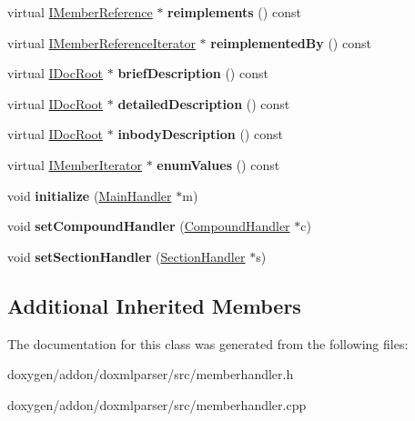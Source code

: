 \begin{DoxyCompactItemize}
virtual \mbox{\hyperlink{class_i_member_reference}{I\+Member\+Reference}} $\ast$ {\bfseries reimplements} () const
\item 
\mbox{\label{class_member_handler_a49ac7fe68be6ef7a936898ff6331d6e6}} 
virtual \mbox{\hyperlink{class_i_member_reference_iterator}{I\+Member\+Reference\+Iterator}} $\ast$ {\bfseries reimplemented\+By} () const
\item 
\mbox{\label{class_member_handler_a20e9b6df52d39abdda9cc197d75e97e8}} 
virtual \mbox{\hyperlink{class_i_doc_root}{I\+Doc\+Root}} $\ast$ {\bfseries brief\+Description} () const
\item 
\mbox{\label{class_member_handler_a165a340c25e1df9e4e68bf8d65c274e3}} 
virtual \mbox{\hyperlink{class_i_doc_root}{I\+Doc\+Root}} $\ast$ {\bfseries detailed\+Description} () const
\item 
\mbox{\label{class_member_handler_a71748bca8b5db16cc68fa991cdb06070}} 
virtual \mbox{\hyperlink{class_i_doc_root}{I\+Doc\+Root}} $\ast$ {\bfseries inbody\+Description} () const
\item 
\mbox{\label{class_member_handler_a2b209d093ff2d7519aafe213887dc7d5}} 
virtual \mbox{\hyperlink{class_i_member_iterator}{I\+Member\+Iterator}} $\ast$ {\bfseries enum\+Values} () const
\item 
\mbox{\label{class_member_handler_aa5cb3b1084f6b5dcf95cce1a3a8c3001}} 
void {\bfseries initialize} (\mbox{\hyperlink{class_main_handler}{Main\+Handler}} $\ast$m)
\item 
\mbox{\label{class_member_handler_a6c51c7b8f2e908935b38c5884f1d297c}} 
void {\bfseries set\+Compound\+Handler} (\mbox{\hyperlink{class_compound_handler}{Compound\+Handler}} $\ast$c)
\item 
\mbox{\label{class_member_handler_ac39c2846f64c32a7311bd15d73587025}} 
void {\bfseries set\+Section\+Handler} (\mbox{\hyperlink{class_section_handler}{Section\+Handler}} $\ast$s)
\end{DoxyCompactItemize}
\subsection*{Additional Inherited Members}


The documentation for this class was generated from the following files\+:\begin{DoxyCompactItemize}
\item 
doxygen/addon/doxmlparser/src/memberhandler.\+h\item 
doxygen/addon/doxmlparser/src/memberhandler.\+cpp\end{DoxyCompactItemize}
